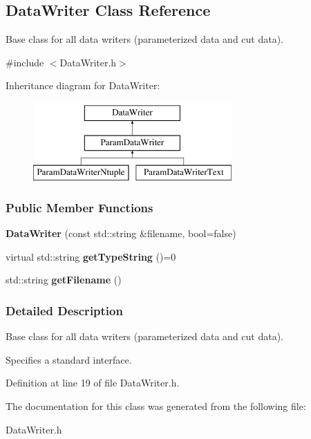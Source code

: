 \hypertarget{classDataWriter}{
\subsection{DataWriter Class Reference}
\label{classDataWriter}
}


Base class for all data writers (parameterized data and cut data).  




{\ttfamily \#include $<$DataWriter.h$>$}

Inheritance diagram for DataWriter:\begin{figure}[H]
\begin{center}
\leavevmode
\includegraphics[height=3.000000cm]{classDataWriter}
\end{center}
\end{figure}
\subsubsection*{Public Member Functions}
\begin{DoxyCompactItemize}
\item 
\hypertarget{classDataWriter_aeeecf23712a2968038cdf7d309de3b50}{
{\bfseries DataWriter} (const std::string \&filename, bool=false)}
\label{classDataWriter_aeeecf23712a2968038cdf7d309de3b50}

\item 
\hypertarget{classDataWriter_a88be2fd630eb6bf633701d0b8c08306a}{
virtual std::string {\bfseries getTypeString} ()=0}
\label{classDataWriter_a88be2fd630eb6bf633701d0b8c08306a}

\item 
\hypertarget{classDataWriter_a1b3278ba4c5dd0922cdaf1bd7b866782}{
std::string {\bfseries getFilename} ()}
\label{classDataWriter_a1b3278ba4c5dd0922cdaf1bd7b866782}

\end{DoxyCompactItemize}


\subsubsection{Detailed Description}
Base class for all data writers (parameterized data and cut data). 

Specifies a standard interface. 

Definition at line 19 of file DataWriter.h.



The documentation for this class was generated from the following file:\begin{DoxyCompactItemize}
\item 
DataWriter.h\end{DoxyCompactItemize}
